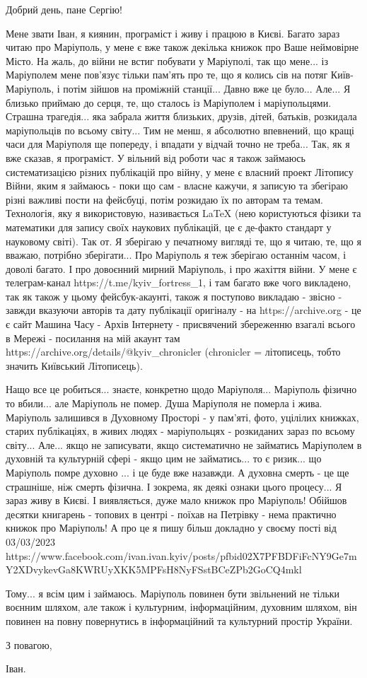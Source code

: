  
 
 
 
 

Добрий день, пане Сергію!

Мене звати Іван, я киянин, програміст і живу і працюю в Києві. Багато зараз
читаю про Маріуполь, у мене є вже також декілька книжок про Ваше неймовірне
Місто. На жаль, до війни не встиг побувати у Маріуполі, так що мене...  із
Маріуполем мене пов'язує тільки пам'ять про те, що я колись сів на потяг
Київ-Маріуполь, і потім зійшов на проміжній станції... Давно вже це було...
Але... Я близько приймаю до серця, те, що сталось із Маріуполем і
маріупольцями. Страшна трагедія... яка забрала життя близьких, друзів, дітей,
батьків, розкидала маріупольців по всьому світу...  Тим не менш, я абсолютно
впевнений, що кращі часи для Маріуполя ще попереду, і впадати у відчай точно не
треба...  Так, як я вже сказав, я програміст. У вільний від роботи час я також
займаюсь систематизацією різних публікацій про війну, у мене є власний проект
Літопису Війни, яким я займаюсь - поки що сам - власне кажучи, я записую та
збегіраю різні важливі пости на фейсбуці, потім розкидаю їх по авторам та
темам. Технологія, яку я використовую, називається LaTeX (нею користуються
фізики та математики для запису своїх наукових публікацій, це є де-факто
стандарт у науковому світі). Так от.  Я зберігаю у печатному вигляді те, що я
читаю, те, що я вважаю, потрібно зберігати...  Про Маріуполь я теж зберігаю
останнім часом, і доволі багато. І про довоєнний мирний Маріуполь, і про
жахіття війни. У мене є телеграм-канал https://t.me/kyiv_fortress_1, і там
багато вже чого викладено, так як також у цьому фейсбук-акаунті, також я
поступово викладаю - звісно - завжди вказуючи авторів та дату публікації
оригіналу - на https://archive.org - це є сайт Машина Часу - Архів Інтернету -
присвячений збереженню взагалі всього в Мережі - посилання на мій акаунт там
https://archive.org/details/@kyiv_chronicler (chronicler = літописець, тобто
значить Київський Літописець).

Нащо все це робиться... знаєте, конкретно щодо Маріуполя... Маріуполь фізично
то вбили...  але Маріуполь не помер. Душа Маріуполя не померла і жива.
Маріуполь залишився в Духовному Просторі - у пам'яті, фото, уцілілих книжках,
старих публікаціях, в живих людях - маріупольцях - розкиданих зараз по всьому
світу...  Але... якщо не записувати, якщо систематично не займатись Маріуполем
в духовній та культурній сфері - якщо цим не займатись... то є ризик... що
Маріуполь помре духовно ...  і це буде вже назавжди. А духовна смерть - це ще
страшніше, ніж смерть фізична. І зокрема, як деякі ознаки цього процесу... Я
зараз живу в Києві. І виявляється, дуже мало книжок про Маріуполь!  Обійшов
десятки книгарень - топових в центрі - поїхав на Петрівку - нема практично
книжок про Маріуполь!  А про це я пишу більш докладно у своєму пості від
03/03/2023
https://www.facebook.com/ivan.ivan.kyiv/posts/pfbid02X7PFBDFiFcNY9Ge7mY2XDvykevGa8KWRUyXKK5MPFsH8NyFSstBCeZPb2GoCQ4mkl

Тому... я всім цим і займаюсь. Маріуполь повинен бути звільнений не тільки
воєнним шляхом, але також і культурним, інформаційним, духовним шляхом, він
повинен на повну повернутись в інформаційний та культурний простір України. 

З повагою,

Іван.
